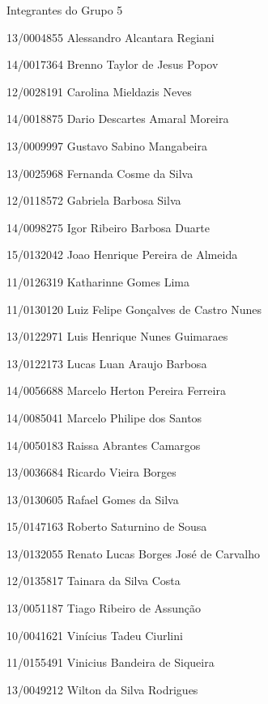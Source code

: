 \begin{folhadeaprovacao}

  \begin{center}
    {\ABNTEXchapterfont\large\imprimirautor}

    \vspace*{\fill}\vspace*{\fill}
    {\ABNTEXchapterfont\bfseries\Large\imprimirtitulo}
    \vspace*{\fill}

    Integrantes do Grupo 5

   \end{center}

  13/0004855 Alessandro Alcantara Regiani

   14/0017364 Brenno Taylor de Jesus Popov

   12/0028191 Carolina Mieldazis Neves

   14/0018875 Dario Descartes Amaral Moreira

   13/0009997 Gustavo Sabino Mangabeira

   13/0025968 Fernanda Cosme da Silva

   12/0118572 Gabriela Barbosa Silva

   14/0098275 Igor Ribeiro Barbosa Duarte

   15/0132042 Joao Henrique Pereira de Almeida

   11/0126319 Katharinne Gomes Lima

   11/0130120 Luiz Felipe Gonçalves de Castro Nunes

   13/0122971 Luis Henrique Nunes Guimaraes

   13/0122173 Lucas Luan Araujo Barbosa

   14/0056688 Marcelo Herton Pereira Ferreira

   14/0085041 Marcelo Philipe dos Santos

   14/0050183 Raissa Abrantes Camargos

   13/0036684 Ricardo Vieira Borges

   13/0130605 Rafael Gomes da Silva

   15/0147163 Roberto Saturnino de Sousa

   13/0132055 Renato Lucas Borges José de Carvalho

   12/0135817 Tainara da Silva Costa

   13/0051187 Tiago Ribeiro de Assunção

   10/0041621 Vinícius Tadeu Ciurlini

   11/0155491 Vinicius Bandeira de Siqueira

  13/0049212 Wilton da Silva Rodrigues

\end{folhadeaprovacao}
